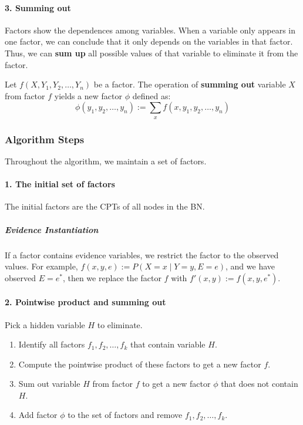 \documentclass[10pt,UTF8]{article}
\theoremstyle{definition}
\newtheorem{definition inner}{Definition}[section]
\theoremstyle{definition}
\newtheorem{theorem inner}{Theorem}[section]
\theoremstyle{definition}
\newtheorem*{proof inner}{\textit{Proof}}
\theoremstyle{plain}
\newtheorem{tip inner}{Tip}[section]
\theoremstyle{remark}
\begin{document}
\paragraph*{3. Summing out}
Factors show the dependences among variables.
When a variable only appears in one factor,
we can conclude that it only depends on the variables in that factor.
Thus, we can \textbf{sum up} all possible values of that variable
to eliminate it from the factor.

Let \(f(X, Y_1, Y_2, \ldots, Y_n )\) be a factor.
The operation of \textbf{summing out} variable \(X\) from factor \(f\)
yields a new factor \(\phi \) defined as:
\[
  \phi(y_1, y_2, \ldots, y_n) := \sum_{x} f(x, y_1, y_2, \ldots, y_n)
\]

\subsubsection{Algorithm Steps}

Throughout the algorithm,
we maintain a set of factors.

\paragraph*{1. The initial set of factors}
The initial factors are the CPTs of all nodes in the BN\@.
\subparagraph*{Evidence Instantiation}
If a factor contains evidence variables,
we restrict the factor to the observed values.
For example, \(f(x, y, e) := P(X=x \mid Y=y, E=e)\),
and we have observed \(E=e^*\),
then we replace the factor \(f\) with \(f'(x, y) := f(x, y, e^*)\).

\paragraph*{2. Pointwise product and summing out}
Pick a hidden variable \(H\) to eliminate.
\begin{enumerate}
  \item Identify all factors \(f_1,f_2,\ldots,f_k\) that contain variable \(H\).
  \item Compute the pointwise product of these factors to get a new
    factor \(f\).
  \item Sum out variable \(H\) from factor \(f\) to get a new factor
    \(\phi \) that does not contain \(H\).
  \item Add factor \(\phi \) to the set of factors and remove
    \(f_1,f_2,\ldots,f_k\).
\end{enumerate}
\end{document}
